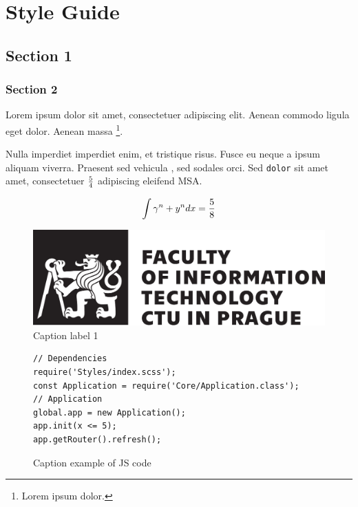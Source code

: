 \chapter{Style Guide}\label{styleguide}

\section{Section 1}
\subsection{Section 2}

\begin{REFACTOR}
	Lorem ipsum dolor sit amet, consectetuer adipiscing elit. Aenean commodo ligula eget dolor. Aenean massa \footnote{Lorem ipsum dolor.}.
\end{REFACTOR}


Nulla imperdiet imperdiet enim, et tristique risus. Fusce eu neque a ipsum aliquam viverra. Praesent sed vehicula , sed sodales orci. Sed \verb|dolor| sit amet amet, consectetuer ${5} \over {4}$ adipiscing eleifend \gls{MSA}.

$$\int {\gamma^n + y^n } dx = { 5 \over 8}$$

\begin{figure}\centering
   \includegraphics[max width=\textwidth]{cvut-logo-bw-en.pdf}
   \caption[List label 1]{Caption label 1}\label{pic:ctulogo}
\end{figure}


\begin{figure}\centering
   \begin{verbatim}
// Dependencies
require('Styles/index.scss');
const Application = require('Core/Application.class');
// Application
global.app = new Application();
app.init(x <= 5);
app.getRouter().refresh();
   \end{verbatim}
   \caption[List example of JS code]{Caption example of JS code}\label{code:jsexample}
\end{figure}


